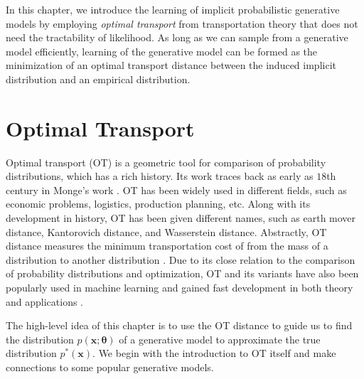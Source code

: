 In this chapter, we introduce the learning of implicit probabilistic generative models by employing \textit{optimal transport} from transportation theory that does not need the tractability of likelihood. As long as we can sample from a generative model efficiently, learning of the generative model can be formed as the minimization of an optimal transport distance between the induced implicit distribution and an empirical distribution.

\section{Optimal Transport}\label{chpt8:sec:ot}
Optimal transport (OT) is a geometric tool for comparison of probability distributions, which has a rich history. Its work traces back as early as $18$th century in Monge's work \cite{monge1781memoire}. OT has been widely used in different fields, such as economic problems, logistics, production planning, etc. Along with its development in history, OT has been given different names, such as earth mover distance, Kantorovich distance, and Wasserstein distance. Abstractly, OT distance measures the minimum transportation cost of from the mass of a distribution to another distribution \cite{villani2003topics}. Due to its close relation to the comparison of probability distributions and optimization, OT and its
variants have also been popularly used in machine learning and gained fast development in both theory and applications \cite{2013arXiv1310.4375C, 2013arXiv1306.0895C, 2016arXiv161006519S, ClaiciCS18}.

The high-level idea of this chapter is to use the OT distance to guide us to find the distribution $p(\bm{x}; \bm{\theta})$ of a generative model to approximate the true distribution $p^{\ast}(\bm{x})$. We begin with the introduction to OT itself and make connections to some popular generative models.

